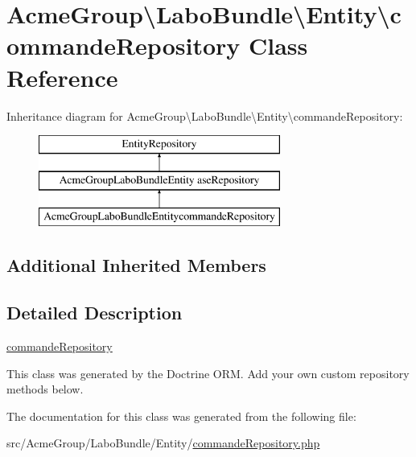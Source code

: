\hypertarget{class_acme_group_1_1_labo_bundle_1_1_entity_1_1commande_repository}{\section{Acme\+Group\textbackslash{}Labo\+Bundle\textbackslash{}Entity\textbackslash{}commande\+Repository Class Reference}
\label{class_acme_group_1_1_labo_bundle_1_1_entity_1_1commande_repository}
}
Inheritance diagram for Acme\+Group\textbackslash{}Labo\+Bundle\textbackslash{}Entity\textbackslash{}commande\+Repository\+:\begin{figure}[H]
\begin{center}
\leavevmode
\includegraphics[height=3.000000cm]{class_acme_group_1_1_labo_bundle_1_1_entity_1_1commande_repository}
\end{center}
\end{figure}
\subsection*{Additional Inherited Members}


\subsection{Detailed Description}
\hyperlink{class_acme_group_1_1_labo_bundle_1_1_entity_1_1commande_repository}{commande\+Repository}

This class was generated by the Doctrine O\+R\+M. Add your own custom repository methods below. 

The documentation for this class was generated from the following file\+:\begin{DoxyCompactItemize}
\item 
src/\+Acme\+Group/\+Labo\+Bundle/\+Entity/\hyperlink{commande_repository_8php}{commande\+Repository.\+php}\end{DoxyCompactItemize}
